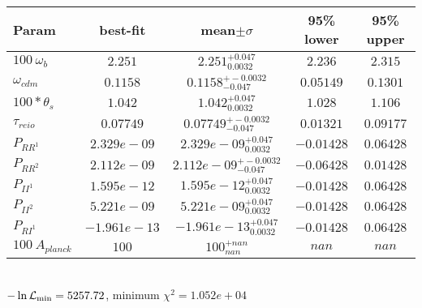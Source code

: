 \begin{tabular}{|l|c|c|c|c|} 
 \hline 
Param & best-fit & mean$\pm\sigma$ & 95\% lower & 95\% upper \\ \hline 
$100~\omega_{b }$ &$2.251$ & $2.251_{0.0032}^{+0.047}$ & $2.236$ & $2.315$ \\ 
$\omega_{cdm }$ &$0.1158$ & $0.1158_{-0.047}^{+-0.0032}$ & $0.05149$ & $0.1301$ \\ 
$100*\theta_{s }$ &$1.042$ & $1.042_{0.0032}^{+0.047}$ & $1.028$ & $1.106$ \\ 
$\tau_{reio }$ &$0.07749$ & $0.07749_{-0.047}^{+-0.0032}$ & $0.01321$ & $0.09177$ \\ 
$P_{{RR}^1 }$ &$2.329e-09$ & $2.329e-09_{0.0032}^{+0.047}$ & $-0.01428$ & $0.06428$ \\ 
$P_{{RR}^2 }$ &$2.112e-09$ & $2.112e-09_{-0.047}^{+-0.0032}$ & $-0.06428$ & $0.01428$ \\ 
$P_{{II}^1 }$ &$1.595e-12$ & $1.595e-12_{0.0032}^{+0.047}$ & $-0.01428$ & $0.06428$ \\ 
$P_{{II}^2 }$ &$5.221e-09$ & $5.221e-09_{0.0032}^{+0.047}$ & $-0.01428$ & $0.06428$ \\ 
$P_{{RI}^1 }$ &$-1.961e-13$ & $-1.961e-13_{0.0032}^{+0.047}$ & $-0.01428$ & $0.06428$ \\ 
$100~A_{planck }$ &$100$ & $100_{nan}^{+nan}$ & $nan$ & $nan$ \\ 
\hline 
 \end{tabular} \\ 
$-\ln{\cal L}_\mathrm{min} =5257.72$, minimum $\chi^2=1.052e+04$ \\ 
